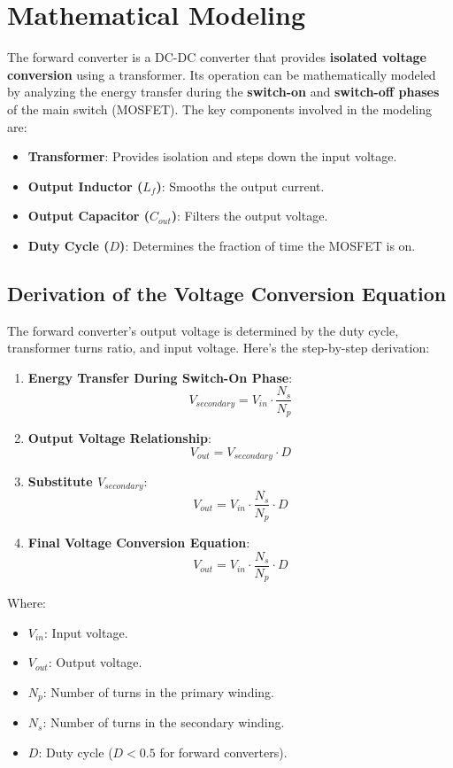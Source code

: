 \section{ Mathematical Modeling}
The forward converter is a DC-DC converter that provides \textbf{isolated voltage conversion} using a transformer. Its operation can be mathematically modeled by analyzing the energy transfer during the \textbf{switch-on} and \textbf{switch-off phases} of the main switch (MOSFET). The key components involved in the modeling are:

\begin{itemize}
    \item \textbf{Transformer}: Provides isolation and steps down the input voltage.
    \item \textbf{Output Inductor ($ L_f $)}: Smooths the output current.
    \item \textbf{Output Capacitor ($ C_{out} $)}: Filters the output voltage.
    \item \textbf{Duty Cycle ($ D $)}: Determines the fraction of time the MOSFET is on.
\end{itemize}
\subsection{Derivation of the Voltage Conversion Equation}
The forward converter's output voltage is determined by the duty cycle, transformer turns ratio, and input voltage. Here’s the step-by-step derivation:

\begin{enumerate}
    \item \textbf{Energy Transfer During Switch-On Phase}:
    \[
    V_{secondary} = V_{in} \cdot \frac{N_s}{N_p}
    \]
    
    \item \textbf{Output Voltage Relationship}:
    \[
    V_{out} = V_{secondary} \cdot D
    \]
    
    \item \textbf{Substitute $ V_{secondary} $}:
    \[
    V_{out} = V_{in} \cdot \frac{N_s}{N_p} \cdot D
    \]
    
    \item \textbf{Final Voltage Conversion Equation}:
    \[
    \boxed{V_{out} = V_{in} \cdot \frac{N_s}{N_p} \cdot D}
    \]
\end{enumerate}

Where:
\begin{itemize}
    \item $ V_{in} $: Input voltage.
    \item $ V_{out} $: Output voltage.
    \item $ N_p $: Number of turns in the primary winding.
    \item $ N_s $: Number of turns in the secondary winding.
    \item $ D $: Duty cycle ($ D < 0.5 $ for forward converters).
\end{itemize}

